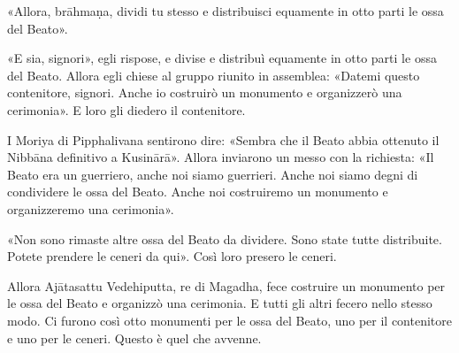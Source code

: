 «Allora, brāhmaṇa, dividi tu stesso e distribuisci equamente in otto parti le
ossa del Beato».

«E sia, signori», egli rispose, e divise e distribuì equamente in otto parti le
ossa del Beato. Allora egli chiese al gruppo riunito in assemblea: «Datemi
questo contenitore, signori. Anche io costruirò un monumento e organizzerò una
cerimonia». E loro gli diedero il contenitore.

I Moriya di Pipphalivana sentirono dire: «Sembra che il Beato abbia ottenuto il
Nibbāna definitivo a Kusinārā». Allora inviarono un messo con la richiesta: «Il
Beato era un guerriero, anche noi siamo guerrieri. Anche noi siamo degni di
condividere le ossa del Beato. Anche noi costruiremo un monumento e
organizzeremo una cerimonia».

«Non sono rimaste altre ossa del Beato da dividere. Sono state tutte
distribuite. Potete prendere le ceneri da qui». Così loro presero le ceneri.

Allora Ajātasattu Vedehiputta, re di Magadha, fece costruire un monumento per le
ossa del Beato e organizzò una cerimonia. E tutti gli altri fecero nello stesso
modo. Ci furono così otto monumenti per le ossa del Beato, uno per il
contenitore e uno per le ceneri. Questo è quel che avvenne.


